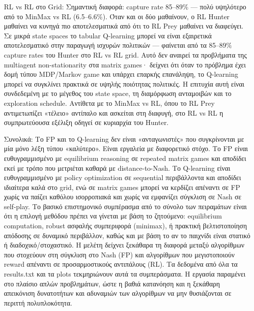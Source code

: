 \documentclass[11pt,a4paper]{article}
\newcommand{\eng}[1]{\foreignlanguage{english}{#1}}
\begin{document}
RL vs RL στο Grid: Σημαντική διαφορά: capture rate 85–89\% — πολύ υψηλότερο από το MinMax vs RL (6.5–6.6\%). Όταν και οι δύο μαθαίνουν, ο RL Hunter μαθαίνει να κυνηγά πιο αποτελεσματικά από ότι το RL Prey μαθαίνει να διαφεύγει. Σε μικρά state spaces το tabular Q-learning μπορεί να είναι εξαιρετικά αποτελεσματικό στην παραγωγή ισχυρών πολιτικών — φαίνεται από τα 85–89\% capture rates του Hunter στο RL vs RL grid. Αυτό δεν αναιρεί τα προβλήματα της multiagent non-stationarity στα matrix games· δείχνει ότι όταν το πρόβλημα έχει δομή τύπου MDP/Markov game και υπάρχει επαρκής επανάληψη, το Q-learning μπορεί να συγκλίνει πρακτικά σε υψηλής ποιότητας πολιτικές. Η επιτυχία αυτή είναι συνδεδεμένη με το μέγεθος του state space, τη διαμόρφωση ανταμοιβών και το exploration schedule. Αντίθετα με το MinMax vs RL, όπου το RL Prey αντιμετωπίζει «τέλειο» αντίπαλο και ασκείται στη διαφυγή, στο RL vs RL η συμπρωτεύουσα εξέλιξη οδηγεί σε κυριαρχία του Hunter.

Συνολικά: Το FP και το Q-learning δεν είναι «ανταγωνιστές» που συγκρίνονται με μία μόνο λέξη τύπου «καλύτερο». Είναι εργαλεία με διαφορετικό στόχο. Το FP είναι ευθυγραμμισμένο με equilibrium reasoning σε repeated matrix games και αποδίδει εκεί με τρόπο που μετριέται καθαρά με distance-to-Nash. Το Q-learning είναι ευθυγραμμισμένο με policy optimization σε sequential περιβάλλοντα και αποδίδει ιδιαίτερα καλά στο grid, ενώ σε matrix games μπορεί να κερδίζει απέναντι σε FP χωρίς να παίζει καθόλου ισορροπιακά και χωρίς να εμφανίζει σύγκλιση σε Nash σε self-play. Το βασικό επιστημονικό συμπέρασμα από το σύνολο των πειραμάτων είναι ότι η επιλογή μεθόδου πρέπει να γίνεται με βάση το ζητούμενο: equilibrium computation, robust ασφαλής συμπεριφορά (minimax), ή πρακτική βελτιστοποίηση απόδοσης σε δυναμικό περιβάλλον, καθώς και με βάση το αν το παιχνίδι είναι στατικό ή διαδοχικό/στοχαστικό. Η μελέτη δείχνει ξεκάθαρα τη διαφορά μεταξύ αλγορίθμων που στοχεύουν στη σύγκλιση στο Nash (FP) και αλγορίθμων που μεγιστοποιούν reward απέναντι σε προσαρμοστικούς αντιπάλους (RL). Τα δεδομένα από όλα τα \eng{results.txt} και τα plots τεκμηριώνουν αυτά τα συμπεράσματα. Η εργασία παραμένει στο πλαίσιο απλών προβλημάτων, ώστε η βαθιά κατανόηση και η ξεκάθαρη απεικόνιση δυνατοτήτων και αδυναμιών των αλγορίθμων να μην θυσιάζονται σε περιττή πολυπλοκότητα.
\end{document}
